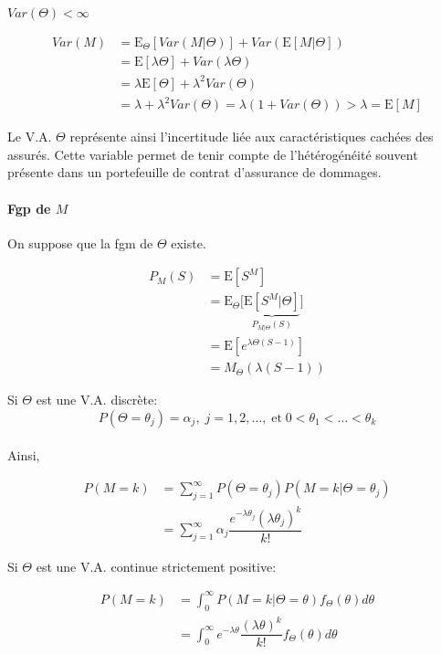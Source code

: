 \(Var(\Theta)<\infty\)

\begin{align*}
Var(M)& = \text{E}_{\Theta}\left [Var(M|\Theta)\right ]+Var\left (\text{E}[M|\Theta]\right )\\
& =\text{E}[\lambda\Theta] + Var(\lambda\Theta)\\
& =\lambda\text{E}[\Theta]+\lambda^2 Var(\Theta)\\
& =\lambda +\lambda^2 Var(\Theta)=\lambda(1+Var(\Theta))>\lambda=\text{E}[M]
\end{align*}

Le V.A. \(\Theta\) représente ainsi l'incertitude liée aux
caractéristiques cachées des assurés. Cette variable permet de tenir
compte de l'hétérogénéité souvent présente dans un portefeuille de
contrat d'assurance de dommages.

\paragraph*{Fgp de \(M\)}\label{fgp-de-m-2}

On suppose que la fgm de \(\Theta\) existe.

\begin{align*}
P_M(S)& =\text{E}[S^M]\\
& =\text{E}_{\Theta}\big [\underbrace{\text{E}[S^M|\Theta]}_{P_{M|\Theta}(S)}\big ]\\
& =\text{E}[e^{\lambda \Theta(S-1)}]\\
& =M_\Theta\left (\lambda(S-1)\right )
\end{align*}

Si \(\Theta\) est une V.A. discrète: \[
P(\Theta=\theta_j)=\alpha_j,\;j=1,2,\dots,\;\text{et}\;0<\theta_1<\dots<\theta_k
\]\\
Ainsi,

\begin{align*}
P(M=k)& = \sum^\infty_{j=1} P(\Theta=\theta_j)P(M=k|\Theta=\theta_j)\\
& = \sum^\infty_{j=1} \alpha_j \dfrac{e^{-\lambda \theta_j}(\lambda\theta_j)^k}{k!}  
\end{align*}

Si \(\Theta\) est une V.A. continue strictement positive:

\begin{align*}
P(M=k)& = \int^\infty_0 P(M=k|\Theta=\theta)f_\Theta(\theta)d\theta\\
& =\int_0^\infty e^{-\lambda \theta} \dfrac{(\lambda\theta)^k}{k!}f_\Theta(\theta)d\theta
\end{align*}

